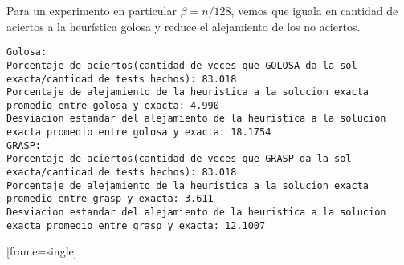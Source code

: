Para un experimento en particular $\beta = n/128$, vemos que iguala en cantidad de aciertos a la heur\'istica golosa y reduce el alejamiento de los no aciertos.

\begin{lstlisting}[frame=single]
Golosa:
Porcentaje de aciertos(cantidad de veces que GOLOSA da la sol exacta/cantidad de tests hechos): 83.018
Porcentaje de alejamiento de la heuristica a la solucion exacta promedio entre golosa y exacta: 4.990
Desviacion estandar del alejamiento de la heuristica a la solucion exacta promedio entre golosa y exacta: 18.1754
GRASP:
Porcentaje de aciertos(cantidad de veces que GRASP da la sol exacta/cantidad de tests hechos): 83.018
Porcentaje de alejamiento de la heuristica a la solucion exacta promedio entre grasp y exacta: 3.611
Desviacion estandar del alejamiento de la heuristica a la solucion exacta promedio entre grasp y exacta: 12.1007
\end{lstlisting}[frame=single]


%
%
%
